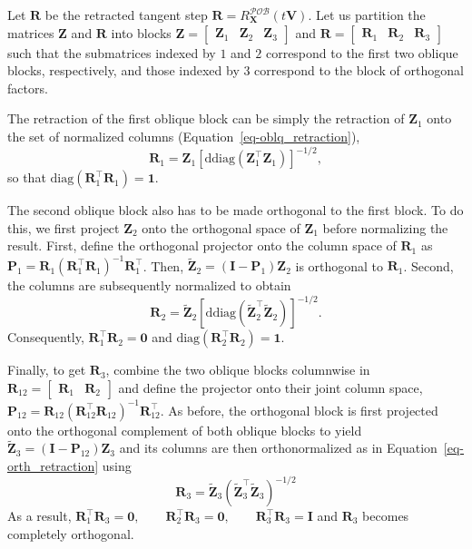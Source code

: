 \documentclass[
  12pt,
  letterpaper,
  article]{scrartcl}
\begin{document}
Let \(\mathbf{R}\) be the retracted tangent step
\(\mathbf{R} = R_{\mathbf{X}}^{\mathcal{POB}}(t\mathbf{V})\). Let us
partition the matrices \(\mathbf{Z}\) and \(\mathbf{R}\) into blocks
\(\mathbf{Z} = \begin{bmatrix} \mathbf{Z}_1 & \mathbf{Z}_2 & \mathbf{Z}_3 \end{bmatrix}\)
and
\(\mathbf{R} = \begin{bmatrix} \mathbf{R}_1 & \mathbf{R}_2 & \mathbf{R}_3 \end{bmatrix}\)
such that the submatrices indexed by \(1\) and \(2\) correspond to the
first two oblique blocks, respectively, and those indexed by \(3\)
correspond to the block of orthogonal factors.

The retraction of the first oblique block can be simply the retraction
of \(\mathbf{Z}_1\) onto the set of normalized columns
(Equation~\ref{eq-oblq_retraction}), \[
\mathbf{R}_1 = \mathbf{Z}_1 \left[ \mathrm{ddiag} \left( \mathbf{Z}_1^\top\mathbf{Z}_1 \right) \right]^{-1/2},
\] so that \(\text{diag}(\mathbf{R}_1^\top \mathbf{R}_1) = \mathbf{1}\).

The second oblique block also has to be made orthogonal to the first
block. To do this, we first project \(\mathbf{Z}_2\) onto the orthogonal
space of \(\mathbf{Z}_1\) before normalizing the result. First, define
the orthogonal projector onto the column space of \(\mathbf{R}_1\) as
\(\mathbf{P}_1 = \mathbf{R}_1 \left( \mathbf{R}_1^\top\mathbf{R}_1 \right)^{-1} \mathbf{R}_1^\top\).
Then,
\(\widetilde{\mathbf{Z}}_2 = \left( \mathbf{I}-\mathbf{P}_1 \right) \mathbf{Z}_2\)
is orthogonal to \(\mathbf{R}_1\). Second, the columns are subsequently
normalized to obtain \[
\mathbf{R}_2 = \widetilde{\mathbf{Z}}_2 \left[ \mathrm{ddiag} \left( \widetilde{\mathbf{Z}}_2^\top \widetilde{\mathbf{Z}}_2 \right) \right]^{-1/2}.
\] Consequently, \(\mathbf{R}_1^\top\mathbf{R}_2 = \mathbf{0}\) and
\(\text{diag} \left( \mathbf{R}_2^\top\mathbf{R}_2 \right) = \mathbf{1}\).

Finally, to get \(\mathbf{R}_3\), combine the two oblique blocks
columnwise in
\(\mathbf{R}_{12} = \begin{bmatrix} \mathbf{R}_1 & \mathbf{R}_2 \end{bmatrix}\)
and define the projector onto their joint column space,
\(\mathbf{P}_{12} = \mathbf{R}_{12} \left( \mathbf{R}_{12}^\top \mathbf{R}_{12} \right)^{-1} \mathbf{R}_{12}^\top\).
As before, the orthogonal block is first projected onto the orthogonal
complement of both oblique blocks to yield
\(\widetilde{\mathbf{Z}}_3 = \left( \mathbf{I}-\mathbf{P}_{12} \right) \mathbf{Z}_3\)
and its columns are then orthonormalized as in
Equation~\ref{eq-orth_retraction} using \[
\mathbf{R}_3 = \widetilde{\mathbf{Z}}_3 \left( \widetilde{\mathbf{Z}}_3^\top \widetilde{\mathbf{Z}}_3 \right)^{-1/2}
\] As a result,
\(\mathbf{R}_1^\top\mathbf{R}_3 = \mathbf{0}, \qquad \mathbf{R}_2^\top\mathbf{R}_3 = \mathbf{0}, \qquad \mathbf{R}_3^\top\mathbf{R}_3 = \mathbf{I}\)
and \(\mathbf{R}_3\) becomes completely orthogonal.
\end{document}
